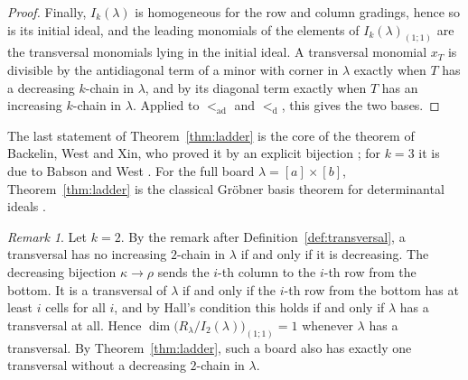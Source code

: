 \documentclass[11pt]{amsart}
\theoremstyle{definition}
\theoremstyle{remark}
\newtheorem{remark}[theorem]{Remark}
\newcommand{\ad}{\mathrm{ad}}
\newcommand{\dg}{\mathrm{d}}
\begin{document}
\begin{proof}
Finally, $I_k(\lambda)$ is homogeneous for the row and column gradings, hence so is its initial ideal, and the leading monomials of the elements of $I_k(\lambda)_{(1;1)}$ are the transversal monomials lying in the initial ideal. A transversal monomial $x_T$ is divisible by the antidiagonal term of a minor with corner in $\lambda$ exactly when $T$ has a decreasing $k$-chain in $\lambda$, and by its diagonal term exactly when $T$ has an increasing $k$-chain in $\lambda$. Applied to $<_\ad$ and $<_\dg$, this gives the two bases.
\end{proof}

The last statement of Theorem~\ref{thm:ladder} is the core of the theorem of Backelin, West and Xin, who proved it by an explicit bijection \cite{BWX}; for $k=3$ it is due to Babson and West \cite{BW}. For the full board $\lambda=[a]\times[b]$, Theorem~\ref{thm:ladder} is the classical Gr\"obner basis theorem for determinantal ideals \cite{Sturmfels}.

\begin{remark}\label{rem:k2board}
Let $k=2$. By the remark after Definition~\ref{def:transversal}, a transversal has no increasing $2$-chain in $\lambda$ if and only if it is decreasing. The decreasing bijection $\kappa\to\rho$ sends the $i$-th column to the $i$-th row from the bottom. It is a transversal of $\lambda$ if and only if the $i$-th row from the bottom has at least $i$ cells for all $i$, and by Hall's condition this holds if and only if $\lambda$ has a transversal at all. Hence $\dim\bigl(R_\lambda/I_2(\lambda)\bigr)_{(1;1)}=1$ whenever $\lambda$ has a transversal. By Theorem~\ref{thm:ladder}, such a board also has exactly one transversal without a decreasing $2$-chain in $\lambda$.
\end{remark}
\end{document}
